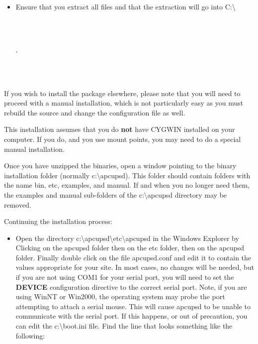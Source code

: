 {{{{{{{{{{\begin{itemize}
\footnotesize
\begin{verbatim}
     
     
\end{verbatim}
\normalsize

\item Ensure that you extract all files and that the extraction will go into
C:\textbackslash{}  

\footnotesize
\begin{verbatim}
     
     
\end{verbatim}
\normalsize

\includegraphics{./wininstall5.eps}  

\footnotesize
\begin{verbatim}
     
     
\end{verbatim}
\normalsize

\end{itemize}

If you wish to install the package elsewhere, please note that you will need
to proceed with a manual installation, which is not particularly easy as you
must rebuild the source and change the configuration file as well.  

This installation assumes that you do {\bf not} have CYGWIN installed on your
computer. If you do, and you use mount points, you may need to do a special
manual installation.  

Once you have unzipped the binaries, open a window pointing to the binary
installation folder (normally c:\textbackslash{}apcupsd). This folder should
contain folders with the name bin, etc, examples, and manual. If and when you
no longer need them, the examples and manual sub-folders of the
c:\textbackslash{}apcupsd directory may be removed.  

Continuing the installation process:  

\begin{itemize}
\item Open the directory
c:\textbackslash{}apcupsd\textbackslash{}etc\textbackslash{}apcupsd in the
Windows Explorer by Clicking on the apcupsd folder then on the etc folder,
then on the apcupsd folder. Finally double click on the file apcupsd.conf and
edit it to contain the values appropriate for your site. In most cases, no
changes will be needed, but if you are not using COM1 for your serial port,
you will need to set the {\bf DEVICE} configuration directive to the correct
serial port. Note, if you are using WinNT or Win2000, the operating system may
probe the port attempting to attach a serial mouse. This will cause apcupsd to
be unable to communicate with the serial port. If this happens, or out of
precaution, you can edit the c:\textbackslash{}boot.ini file. Find the line
that looks something like the following:  


\end{itemize}}}}}}}}}}}
